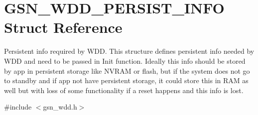 \hypertarget{a00282}{
\section{GSN\_\-WDD\_\-PERSIST\_\-INFO Struct Reference}
\label{a00282}
}


Persistent info required by WDD. This structure defines persistent info needed by WDD and need to be passed in Init function. Ideally this info should be stored by app in persistent storage like NVRAM or flash, but if the system does not go to standby and if app not have persistent storage, it could store this in RAM as well but with loss of some functionality if a reset happens and this info is lost.  




{\ttfamily \#include $<$gsn\_\-wdd.h$>$}

